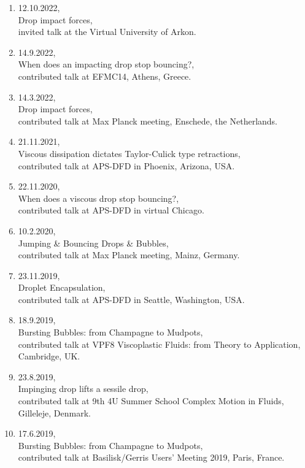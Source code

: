 \documentclass[11pt,a4paper,roman,english,colorlinks,linkcolor=true]{moderncv}
\begin{document}
\begin{enumerate}[leftmargin=2.5cm]
	\item 12.10.2022,\\
	Drop impact forces,\\
	invited talk at the Virtual University of Arkon.
	
	\item 14.9.2022,\\
	When does an impacting drop stop bouncing?,\\
	contributed talk at EFMC14, Athens, Greece.
	
	\item 14.3.2022,\\
	Drop impact forces,\\
	contributed talk at Max Planck meeting, Enschede, the Netherlands.
	
	\item 21.11.2021,\\
	Viscous dissipation dictates Taylor-Culick type retractions,\\
	contributed talk at APS-DFD in Phoenix, Arizona, USA.
	
	\item 22.11.2020,\\
	When does a viscous drop stop bouncing?,\\
	contributed talk at APS-DFD in virtual Chicago.
	
	\item 10.2.2020,\\
	Jumping \& Bouncing Drops \& Bubbles,\\
	contributed talk at Max Planck meeting, Mainz, Germany.
	
	\item 23.11.2019,\\
	Droplet Encapsulation,\\
	contributed talk at APS-DFD in Seattle, Washington, USA.
	
	\item 18.9.2019,\\
	Bursting Bubbles: from Champagne to Mudpots,\\
	contributed talk at VPF8 Viscoplastic Fluids: from Theory to Application, Cambridge, UK.
		
	\item 23.8.2019,\\
	Impinging drop lifts a sessile drop,\\
	contributed talk at 9th 4U Summer School Complex Motion in Fluids, Gilleleje, Denmark.
	
	\item 17.6.2019,\\
	Bursting Bubbles: from Champagne to Mudpots,\\
	contributed talk at Basilisk/Gerris Users' Meeting 2019, Paris, France.
	

\end{enumerate}
\end{document}
